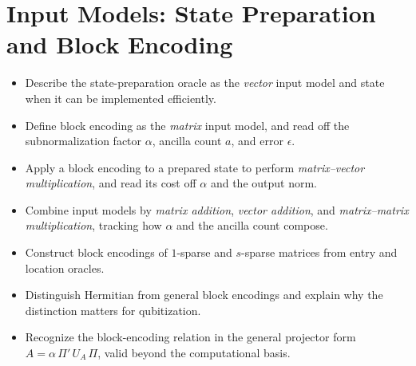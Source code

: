 \chapter{Input Models: State Preparation and Block Encoding}
\label{ch:lec06}

\begin{objectives}
\begin{itemize}[leftmargin=1.4em,nosep]
  \item Describe the state-preparation oracle as the \emph{vector} input model and
        state when it can be implemented efficiently.
  \item Define block encoding as the \emph{matrix} input model, and read off the
        subnormalization factor $\alpha$, ancilla count $a$, and error $\epsilon$.
  \item Apply a block encoding to a prepared state to perform
        \emph{matrix--vector multiplication}, and read its cost off $\alpha$ and the
        output norm.
  \item Combine input models by \emph{matrix addition}, \emph{vector addition}, and
        \emph{matrix--matrix multiplication}, tracking how $\alpha$ and the ancilla
        count compose.
  \item Construct block encodings of $1$-sparse and $s$-sparse matrices from
        entry and location oracles.
  \item Distinguish Hermitian from general block encodings and explain why the
        distinction matters for qubitization.
  \item Recognize the block-encoding relation in the general projector form
        $A=\alpha\,\Pi'\,U_A\,\Pi$, valid beyond the computational basis.
\end{itemize}
\end{objectives}

